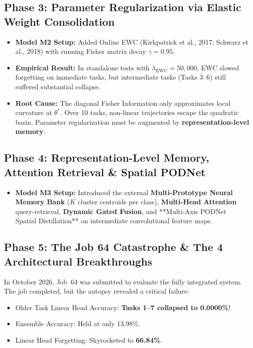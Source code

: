 \documentclass[11pt,a4paper]{article}
\begin{document}
\subsection{Phase 3: Parameter Regularization via Elastic Weight Consolidation}
\begin{itemize}[leftmargin=*]
    \item \textbf{Model M2 Setup:} Added Online EWC (Kirkpatrick et al., 2017; Schwarz et al., 2018) with running Fisher matrix decay $\gamma = 0.95$.
    \item \textbf{Empirical Result:} In standalone tests with $\lambda_{\text{EWC}} = 50,000$, EWC slowed forgetting on immediate tasks, but intermediate tasks (Tasks 3--6) still suffered substantial collapse.
    \item \textbf{Root Cause:} The diagonal Fisher Information only approximates local curvature at $\theta^*$. Over 10 tasks, non-linear trajectories escape the quadratic basin. Parameter regularization must be augmented by \textbf{representation-level memory}.
\end{itemize}

\subsection{Phase 4: Representation-Level Memory, Attention Retrieval \& Spatial PODNet}
\begin{itemize}[leftmargin=*]
    \item \textbf{Model M3 Setup:} Introduced the external \textbf{Multi-Prototype Neural Memory Bank} ($K$ cluster centroids per class), \textbf{Multi-Head Attention} query-retrieval, \textbf{Dynamic Gated Fusion}, and **Multi-Axis PODNet Spatial Distillation** on intermediate convolutional feature maps.
\end{itemize}

\subsection{Phase 5: The Job 64 Catastrophe \& The 4 Architectural Breakthroughs}
In October 2026, Job~64 was submitted to evaluate the fully integrated system. The job completed, but the autopsy revealed a critical failure:
\begin{callout}
\begin{itemize}[noitemsep]
    \item Older Task Linear Head Accuracy: \textbf{Tasks 1--7 collapsed to 0.0000\%}!
    \item Ensemble Accuracy: Held at only 13.98\%.
    \item Linear Head Forgetting: Skyrocketed to \textbf{66.84\%}.
\end{itemize}
\end{callout}
\end{document}
